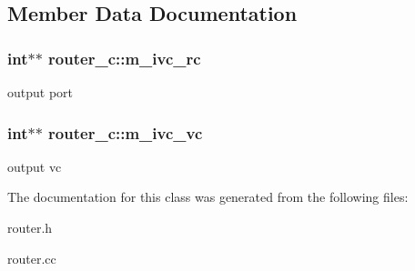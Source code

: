 \subsection{Member Data Documentation}
\hypertarget{classrouter__c_ac954004722bae143a3c864483fc215b1}{
\subsubsection[{m\_\-ivc\_\-rc}]{\setlength{\rightskip}{0pt plus 5cm}int$\ast$$\ast$ {\bf router\_\-c::m\_\-ivc\_\-rc}}}
\label{classrouter__c_ac954004722bae143a3c864483fc215b1}
output port \hypertarget{classrouter__c_a0616862e6a4f2c02b494f34ccace2347}{
\subsubsection[{m\_\-ivc\_\-vc}]{\setlength{\rightskip}{0pt plus 5cm}int$\ast$$\ast$ {\bf router\_\-c::m\_\-ivc\_\-vc}}}
\label{classrouter__c_a0616862e6a4f2c02b494f34ccace2347}
output vc 

The documentation for this class was generated from the following files:\begin{DoxyCompactItemize}
\item 
router.h\item 
router.cc\end{DoxyCompactItemize}
